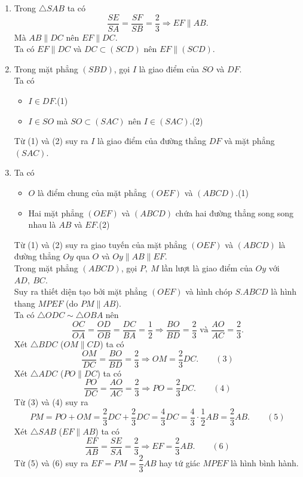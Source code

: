 \begin{bt}
{\begin{enumerate}
\begin{itemize}
		\end{itemize}
		Từ (1) và (2) suy ra giao tuyến của mặt phẳng $(SAB)$ và $(SCD)$ là đường thẳng $Sx$ qua $S$ và $Sx\parallel AB\parallel DC$.
		\item Trong $\triangle SAB$ ta có \[\dfrac{SE}{SA}=\dfrac{SF}{SB}=\dfrac{2}{3}\Rightarrow EF\parallel AB.\]
		Mà $AB\parallel DC$ nên $EF\parallel DC$.\\
		Ta có $EF\parallel DC$ và $DC\subset(SCD)$ nên $EF\parallel (SCD)$.
		\item Trong mặt phẳng $(SBD)$, gọi $I$ là giao điểm của $SO$ và $DF$.\\
		Ta có 
		\begin{itemize}
			\item $I\in DF$.\qquad(1)
			\item $I\in SO$ mà $SO\subset(SAC)$ nên $I\in(SAC)$.\qquad(2)
		\end{itemize} 
		Từ (1) và (2) suy ra $I$ là giao điểm của đường thẳng $DF$ và mặt phẳng $(SAC)$.
		\item Ta có 
		\begin{itemize}
			\item $O$ là điểm chung của mặt phẳng $(OEF)$ và $(ABCD)$.\qquad(1)
			\item Hai mặt phẳng $(OEF)$ và $(ABCD)$ chứa hai đường thẳng song song nhau là $AB$ và $EF$.\qquad(2)
		\end{itemize}
		Từ (1) và (2) suy ra giao tuyến của mặt phẳng $(OEF)$ và $(ABCD)$ là đường thẳng $Oy$ qua $O$ và $Oy\parallel AB\parallel EF$.\\
		Trong mặt phẳng $(ABCD)$, gọi $P,~M$ lần lượt là giao điểm của $Oy$ với $AD,~BC$.\\
		Suy ra  thiết diện tạo bởi mặt phẳng $(OEF)$ và hình chóp $S.ABCD$ là hình thang $MPEF$ (do $PM\parallel AB$).\\
		Ta có $\triangle ODC \sim \triangle OBA$ nên \[\dfrac{OC}{OA}=\dfrac{OD}{OB}=\dfrac{DC}{BA}=\dfrac{1}{2}\Rightarrow \dfrac{BO}{BD}=\dfrac{2}{3} \text{ và }\dfrac{AO}{AC}=\dfrac{2}{3}.\]
		Xét $\triangle BDC$ ($OM\parallel CD$) ta có\[\dfrac{OM}{DC}=\dfrac{BO}{BD}=\dfrac{2}{3}\Rightarrow OM=\dfrac{2}{3}DC.\qquad(3)\]
		Xét $\triangle ADC$ ($PO\parallel DC$) ta có\[\dfrac{PO}{DC}=\dfrac{AO}{AC}=\dfrac{2}{3}\Rightarrow PO=\dfrac{2}{3}DC.\qquad(4)\]
		Từ (3) và (4) suy ra \[PM=PO+OM=\dfrac{2}{3}DC+\dfrac{2}{3}DC=\dfrac{4}{3}DC=\dfrac{4}{3}\cdot\dfrac{1}{2}AB=\dfrac{2}{3}AB.\qquad(5)\]
		Xét $\triangle SAB$ ($EF\parallel AB$) ta có
		\[\dfrac{EF}{AB}=\dfrac{SE}{SA}=\dfrac{2}{3}\Rightarrow EF=\dfrac{2}{3}AB.\qquad(6)\]
		Từ (5) và (6) suy ra $EF=PM=\dfrac{2}{3}AB$ hay tứ giác $MPEF$ là hình bình hành.
	\end{enumerate}
	}
\end{bt}


